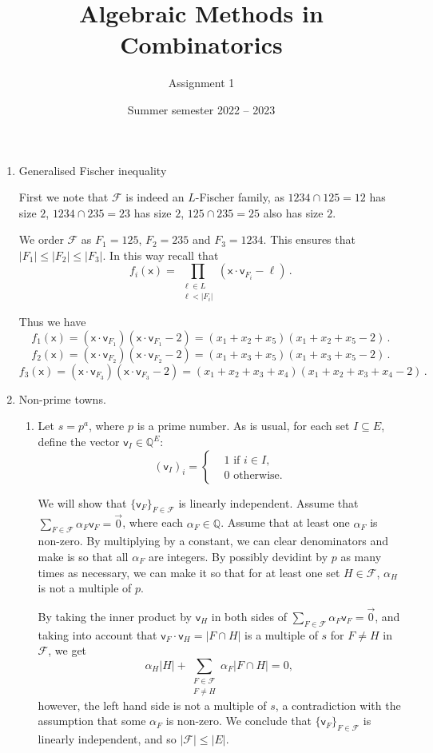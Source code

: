\documentclass[kulak]{tplt}
\title{Algebraic Methods in Combinatorics}
\author{Assignment 1}
\date{Summer semester 2022 -- 2023}
\theoremstyle{definition}
\newcommand{\Q}{\mathbb{Q}}
\newcommand{\FF}{\mathcal F}
\newcommand{\vv}{\mathsf{v}}
\newcommand{\vx}{\mathsf{x}}
\begin{document}
\maketitle
\begin{enumerate}
\item Generalised Fischer inequality

First we note that $\FF $ is indeed an $L$-Fischer family, as $1234 \cap 125 = 12 $ has size $2$, $1234 \cap 235 = 23 $ has size $2$, $125 \cap 235 = 25 $ also has size $2$.

We order $\FF $ as $F_1 = 125$, $F_2 = 235$ and $F_3 = 1234$.
This ensures that $|F_1 | \leq |F_2| \leq |F_3|$.
In this way recall that
$$f_i (\vx) = \prod_{\substack{\ell \in L \\ \ell < |F_i|}} (\vx \cdot \vv_{F_i} - \ell ) \, . $$

Thus we have 
$$f_1(\vx) = ( \vx \cdot \vv_{F_1} ) (\vx \cdot \vv_{F_1} - 2 ) = (x_1 + x_2 + x_5 ) (x_1 + x_2 + x_5 - 2) \,  . $$
$$f_2(\vx) = ( \vx \cdot \vv_{F_2} ) (\vx \cdot \vv_{F_2} - 2 ) = (x_1 + x_3 + x_5 ) (x_1 + x_3 + x_5 - 2) \,  . $$
$$f_3(\vx) = ( \vx \cdot \vv_{F_3} ) (\vx \cdot \vv_{F_3} - 2 ) = (x_1 + x_2 + x_3 + x_4 ) (x_1 + x_2 + x_3 + x_4 - 2) \,  . $$


\item Non-prime towns.

\begin{enumerate}
\item 
Let $s = p^a$, where $p$ is a prime number.
As is usual, for each set $I \subseteq E$, define the vector $\vv_I \in \Q^E$:
$$ (\vv_I)_i =\begin{cases*}
      & 1 \text{ if $i \in I$,}\\
      & 0 \text{ otherwise.}
    \end{cases*} $$

We will show that $\{\vv_F\}_{F\in \FF}$ is linearly independent.
Assume that $\sum_{F \in \FF} \alpha_F \vv_F = \vec{0}$, where each $\alpha_F \in \Q$.
Assume that at least one $\alpha_F$ is non-zero.
By multiplying by a constant, we can clear denominators and make is so that all $\alpha_F$ are integers.
By possibly devidint by $p$ as many times as necessary, we can make it so that for at least one set $H\in \FF$, $\alpha_H$ is not a multiple of $p$.

By taking the inner product by $\vv_H$ in both sides of $\sum_{F \in \FF} \alpha_F \vv_F = \vec{0}$, and taking into account that $\vv_F \cdot \vv_H = |F \cap H|$ is a multiple of $s$ for $F\neq H$ in $\FF$, we get
$$\alpha_H |H| + \sum_{\substack{F \in \FF\\ F \neq H}} \alpha_F |F \cap H| =  0 , \, $$
however, the left hand side is not a multiple of $s$, a contradiction with the assumption that some $\alpha_F$ is non-zero.
We conclude that $\{\vv_F\}_{F\in \FF}$ is linearly independent, and so $|\FF | \leq |E|$.


\end{enumerate}
\end{enumerate}
\end{document}
